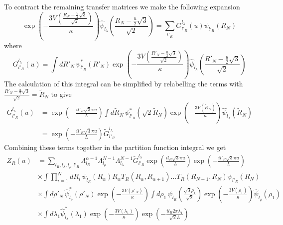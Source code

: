 %
To contract the remaining transfer matrices we make the following expansion
%
\begin{equation}
\label{r_expansion}
\exp\left(-\frac{3V(\frac{R_N-\frac{u}{2}\sqrt{3}}{\sqrt{2}})}{\kappa}\right)\hat{\psi}_{l_\lambda}\left(\frac{R_N-\frac{u}{2}\sqrt{3}}{\sqrt{2}}\right)=\sum_{l'_{R}}G_{l'_R}^{l_{\lambda}}\left(u\right)\psi_{l'_R}\left(R_N\right)
\end{equation}
%
where
%
\begin{equation}
G_{l'_R}^{l_{\lambda}}\left(u\right)=\int dR'_{N}\, \psi_{l'_R}^{*}\left(R'_N\right)\exp\left(-\frac{3V(\frac{R'_N-\frac{u}{2}\sqrt{3}}{\sqrt{2}})}{\kappa}\right)\hat{\psi}_{l_\lambda}\left(\frac{R'_N-\frac{u}{2}\sqrt{3}}{\sqrt{2}}\right)
\end{equation}
%
The calculation of this integral can be simplified by relabelling the terms with $\frac{R'_N-\frac{u}{2}\sqrt{3}}{\sqrt{2}} = \tilde{R}_N$ to give
%
\begin{align}
G_{l'_R}^{l_{\lambda}}\left(u\right)&=\exp\left(-\frac{il'_{R}\sqrt{3}\pi u}{L} \right) \int d\tilde{R}_N\, \psi_{l'_R}^{*}\left(\sqrt{2}\tilde{R}_N\right)\exp\left(-\frac{3V\left(\tilde{R}_N\right)}{\kappa}\right)\hat{\psi}_{l_\lambda}\left(\tilde{R}_N\right)\nonumber\\
&=\exp\left(-\frac{il'_{R}\sqrt{3}\pi u}{L} \right)\tilde{G}_{l'_R}^{l_{\lambda}}
\end{align}
%
Combining these terms together in the partition function integral we get
%
\begin{equation}\label{col_har_mxd_r_3}
\begin{split}
Z_{R}\left(u\right) &=\sum_{l_R,l_\lambda,l_\rho,l'_R}\Lambda_{l_R}^{\alpha-1}\Lambda_{l_\rho}^{N-1}\Lambda_{l_\lambda}^{N-1}\tilde{G}_{l'_R}^{l_{\lambda}}\exp\left(\frac{il_{R}\sqrt{3}\pi u}{L}\right)\exp\left(-\frac{il'_{R}\sqrt{3}\pi u}{L} \right)\\
&\times\int\prod^{N}_{i=1}dR_i\,\psi_{l_R}\left(R_{\alpha}\right)R_{\alpha}T_{R}\left(R_{\alpha},R_{\alpha+1}\right)...T_{R}\left(R_{N-1},R_{N}\right)\psi_{l'_R}\left(R_N\right)\\
&\times\int d\rho'_N\,\hat{\psi}^{*}_{l_\rho}\left(\rho'_{N}\right)\exp\left(-\frac{3V(\rho'_{N})}{\kappa}\right)\int d\rho_1\,\psi_{l_R}\left( \frac{\sqrt{3}\rho_1}{\sqrt{2}}\right)\exp\left(-\frac{3V(\rho_{1})}{\kappa}\right)\hat{\psi}_{l_\rho}\left(\rho_{1}\right)\\
&\times\int d\lambda_1\hat{\psi}^{*}_{l_\lambda}\left(\lambda_{1}\right)\exp\left(-\frac{3V(\lambda_{1})}{\kappa}\right)\exp\left(-\frac{il_{R}2\pi\lambda_1}{\sqrt{2}L} \right)
\end{split}
\end{equation} 
